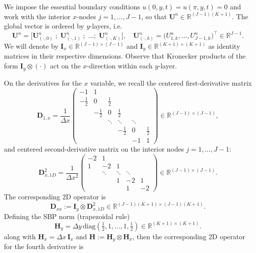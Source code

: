 \documentclass[12pt]{article}
\numberwithin{equation}{section}
\begin{document}
\medskip
\noindent We impose the essential boundary conditions $u(0,y,t)=u(\pi,y,t)=0$ and work with the interior $x$-nodes $j=1,\dots,J-1$, so that $\boldsymbol U^n \in \mathbb{R}^{(J-1)(K+1)}$. The global vector is ordered by $y$-layers, i.e.
\[
\boldsymbol U^n
=
\big[
\boldsymbol U^n_{(\cdot,0)}\; ;\;
\boldsymbol U^n_{(\cdot,1)}\; ;\;\dots;\;
\boldsymbol U^n_{(\cdot,K)}
\big],
\quad
\boldsymbol U^n_{(\cdot,k)}
=
\big(U^n_{1,k},\dots,U^n_{J-1,k}\big)^\top\in\mathbb{R}^{J-1}.
\]
We will denote by $\boldsymbol{I}_x\in \mathbb{R}^{(J-1)\times (J-1)}$ and $\boldsymbol{I}_y\in \mathbb{R}^{(K+1)\times (K+1)}$ as identity matrices in their respective dimensions. Observe that Kronecker products of the form $\boldsymbol I_y\otimes(\cdot)$ act on
the $x$-direction within each $y$-layer.

\medskip
\noindent On the derivatives for the $x$ variable, we recall the centered first-derivative matrix
\[
\boldsymbol D_{1,x}
=
\frac{1}{\Delta x}
\begin{pmatrix}
-1 &  1 &        &        &        &  \\
-\tfrac12 & 0 & \tfrac12 &        &        &  \\
        & -\tfrac12 & 0 & \tfrac12 &        &  \\
        &        & \ddots & \ddots & \ddots &  \\
        &        &        & -\tfrac12 & 0 & \tfrac12 \\
        &        &        &        & -1 & 1
\end{pmatrix} \in \mathbb{R}^{(J-1)\times(J-1)},
\]
and centered second-derivative matrix on the interior nodes
$j=1,\dots,J-1$:
\[
\boldsymbol D_{x,1D}^2
=
\frac{1}{\Delta x^2}
\begin{pmatrix}
-2 & 1  &        &        &  \\
 1 & -2 & 1      &        &  \\
   & \ddots & \ddots & \ddots & \\
   &        & 1      & -2     & 1\\
   &        &        & 1      & -2
\end{pmatrix}
\in\mathbb{R}^{(J-1)\times(J-1)}.
\]
The corresponding 2D operator is
\[
\boldsymbol D_{xx} := \boldsymbol I_y\otimes \boldsymbol D_{x,1D}^2
\in\mathbb{R}^{(J-1)(K+1)\times(J-1)(K+1)}.
\]
Defining the SBP norm (trapezoidal rule)
\[
\boldsymbol H_y
=
\Delta y\,\mathrm{diag}\!\left(\tfrac12,1,\dots,1,\tfrac12\right)
\in\mathbb{R}^{(K+1)\times(K+1)}.
\]
along with $\boldsymbol H_x=\Delta x\,\boldsymbol I_x$ and $\boldsymbol{H} := \boldsymbol H_y \otimes \boldsymbol H_x $, then the corresponding 2D operator for the fourth derivative is
\end{document}
